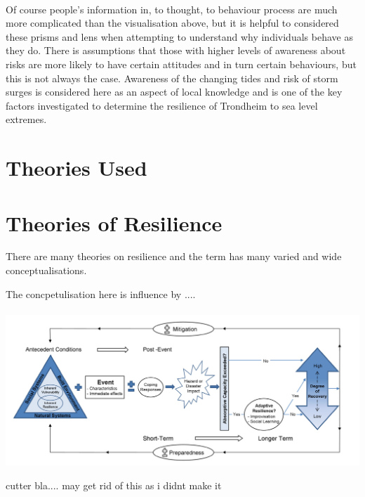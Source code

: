 \paragraph{}
Of course people's information in, to thought, to behaviour process are much more complicated than the visualisation above, but it is helpful to considered these prisms and lens when attempting to understand why individuals behave as they do. There is assumptions that those with higher levels of awareness about risks are more likely to have certain attitudes and in turn certain behaviours, but this is not always the case. \cite{lujala_climate_2015}  Awareness of the changing tides and risk of storm surges is considered here as an aspect of local knowledge and is one of the key factors investigated to determine the resilience of Trondheim to sea level extremes. 

\section{Theories Used}


\section{Theories of Resilience }

There are many theories on resilience and the term has many varied and wide conceptualisations. 

The concpetulisation here is influence by ....

\paragraph{}
\includegraphics[width=1\textwidth]{fig_theory/cutter_2008.png}
\begin{frame}{cutter bla.... may get rid of this as i didnt make it}
    
\end{frame}

